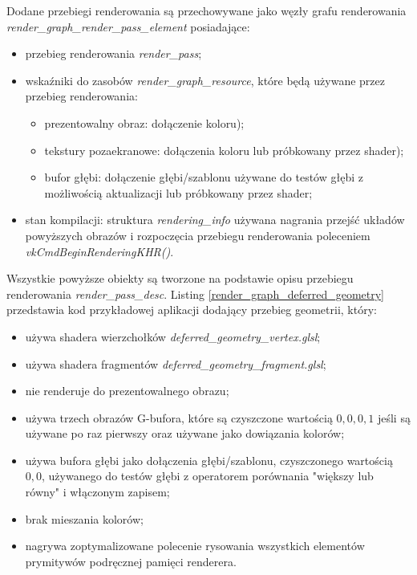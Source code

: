 Dodane przebiegi renderowania są przechowywane jako węzły grafu renderowania \textit{render\_graph\_render\_pass\_element} posiadające:
\begin{itemize}
	\item przebieg renderowania \textit{render\_pass};
	\item wskaźniki do zasobów \textit{render\_graph\_resource}, które będą używane przez przebieg renderowania:
	\begin{itemize}
		\item prezentowalny obraz: dołączenie koloru);
		\item tekstury pozaekranowe: dołączenia koloru lub próbkowany przez shader);
		\item bufor głębi: dołączenie głębi/szablonu używane do testów głębi z możliwością aktualizacji lub próbkowany przez shader;
	\end{itemize}
	\item stan kompilacji: struktura \textit{rendering\_info} używana nagrania przejść układów powyższych obrazów i rozpoczęcia przebiegu renderowania poleceniem \textit{vkCmdBeginRenderingKHR()}.
\end{itemize}
Wszystkie powyższe obiekty są tworzone na podstawie opisu przebiegu renderowania \textit{render\_pass\_desc}. Listing \ref{render_graph_deferred_geometry} przedstawia kod przykładowej aplikacji dodający przebieg geometrii, który:
\begin{itemize}
	\item używa shadera wierzchołków \textit{deferred\_geometry\_vertex.glsl};
	\item używa shadera fragmentów \textit{deferred\_geometry\_fragment.glsl};
	\item nie renderuje do prezentowalnego obrazu;
	\item używa trzech obrazów G-bufora, które są czyszczone wartością $0,0,0,1$ jeśli są używane po raz pierwszy oraz używane jako dowiązania kolorów;
	\item używa bufora głębi jako dołączenia głębi/szablonu, czyszczonego wartością $0,0$, używanego do testów głębi z operatorem porównania "większy lub równy" i włączonym zapisem;
	\item brak mieszania kolorów;
	\item nagrywa zoptymalizowane polecenie rysowania wszystkich elementów prymitywów podręcznej pamięci renderera.
\end{itemize}
\lstset{language=C}
